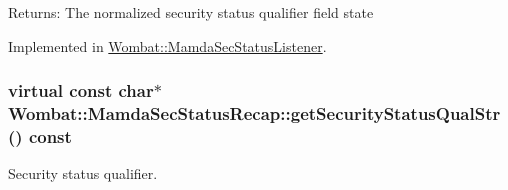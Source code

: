 \begin{Desc}
\item[Returns:]The normalized security status qualifier field state \end{Desc}


Implemented in \hyperlink{classWombat_1_1MamdaSecStatusListener_e3202a65672a14d3d890a4318f391856}{Wombat::Mamda\-Sec\-Status\-Listener}.\hypertarget{classWombat_1_1MamdaSecStatusRecap_770dd1fad1b1e74527b98062e0426759}{
\subsubsection[getSecurityStatusQualStr]{\setlength{\rightskip}{0pt plus 5cm}virtual const char$\ast$ Wombat::Mamda\-Sec\-Status\-Recap::get\-Security\-Status\-Qual\-Str () const}}
\label{classWombat_1_1MamdaSecStatusRecap_770dd1fad1b1e74527b98062e0426759}


Security status qualifier. 

